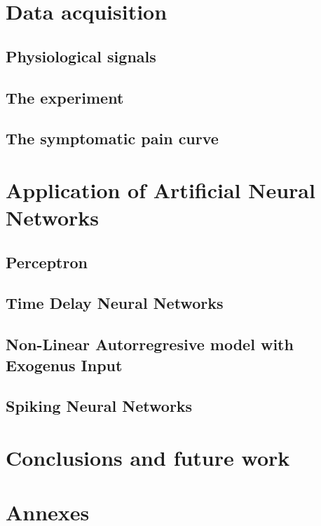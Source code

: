 \documentclass[a4paper,11pt,english]{report} %
\begin{document}
\chapter{Data acquisition}

\section{Physiological signals}

\section{The experiment}

\section{The symptomatic pain curve}


\chapter{Application of Artificial Neural Networks}

\section{Perceptron}

\section{Time Delay Neural Networks}

\section{Non-Linear Autorregresive model with Exogenus Input}

\section{Spiking Neural Networks}


\chapter{Conclusions and future work}

\chapter*{Annexes}






\cleardoublepage
\end{document}
